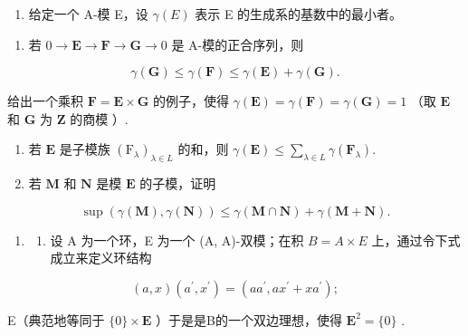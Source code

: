 \begin{enumerate}
\def\labelenumi{\arabic{enumi}.}
\setcounter{enumi}{5}
\tightlist
\item
  给定一个 A-模 E，设 \(\gamma(E)\) 表示 E 的生成系的基数中的最小者。
\end{enumerate}

\begin{enumerate}
\def\labelenumi{(\alph{enumi})}
\tightlist
\item
  若 \(0 \to \mathbf{E} \to \mathbf{F} \to \mathbf{G} \to 0\) 是 A-模的正合序列，则
\end{enumerate}

\[
\gamma (\mathbf {G}) \leqslant \gamma (\mathbf {F}) \leqslant \gamma (\mathbf {E}) + \gamma (\mathbf {G}).
\]

给出一个乘积 \(\mathbf{F} = \mathbf{E} \times \mathbf{G}\) 的例子，使得 \(\gamma(\mathbf{E}) = \gamma(\mathbf{F}) = \gamma(\mathbf{G}) = 1\) （取 \(\mathbf{E}\) 和 \(\mathbf{G}\) 为 \(\mathbf{Z}\) 的商模 ）.

\begin{enumerate}
\def\labelenumi{(\alph{enumi})}
\setcounter{enumi}{1}
\item
  若 \(\mathbf{E}\) 是子模族 \((\mathrm{F}_{\lambda})_{\lambda \in L}\) 的和，则 \(\gamma (\mathbf{E})\leqslant \sum_{\lambda \in L}\gamma (\mathbf{F}_{\lambda}).\)
\item
  若 \(\mathbf{M}\) 和 \(\mathbf{N}\) 是模 \(\mathbf{E}\) 的子模，证明
\end{enumerate}

\[
\sup (\gamma (\mathbf {M}), \gamma (\mathbf {N})) \leqslant \gamma (\mathbf {M} \cap \mathbf {N}) + \gamma (\mathbf {M} + \mathbf {N}).
\]

\begin{enumerate}
\def\labelenumi{\arabic{enumi}.}
\setcounter{enumi}{6}
\tightlist
\item
  \begin{enumerate}
  \def\labelenumii{(\alph{enumii})}
  \tightlist
  \item
    设 A 为一个环，E 为一个 (A, A)-双模；在积 \(B = A \times E\) 上，通过令下式成立来定义环结构
  \end{enumerate}
\end{enumerate}

\[
(a, x) (a ^ {\prime}, x ^ {\prime}) = (a a ^ {\prime}, a x ^ {\prime} + x a ^ {\prime});
\]

E（典范地等同于 \(\{0\} \times \mathbf{E}\) ）于是是B的一个双边理想，使得 \(\mathbf{E}^2 = \{0\}\) .

